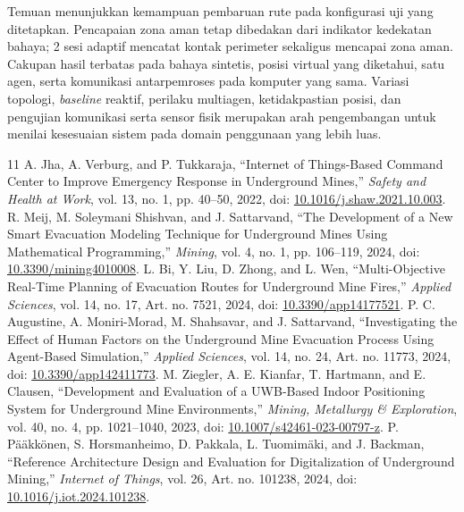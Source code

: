 \documentclass[10pt,a4paper]{article}
\begin{document}
Temuan menunjukkan kemampuan pembaruan rute pada konfigurasi uji yang ditetapkan. Pencapaian zona aman tetap dibedakan dari indikator kedekatan bahaya; 2 sesi adaptif mencatat kontak perimeter sekaligus mencapai zona aman. Cakupan hasil terbatas pada bahaya sintetis, posisi virtual yang diketahui, satu agen, serta komunikasi antarpemroses pada komputer yang sama. Variasi topologi, \emph{baseline} reaktif, perilaku multiagen, ketidakpastian posisi, dan pengujian komunikasi serta sensor fisik merupakan arah pengembangan untuk menilai kesesuaian sistem pada domain penggunaan yang lebih luas.

\FloatBarrier
\begin{thebibliography}{11}
\setlength{\itemsep}{2pt}\setlength{\parskip}{0pt}
 A. Jha, A. Verburg, and P. Tukkaraja, ``Internet of Things-Based Command Center to Improve Emergency Response in Underground Mines,'' \emph{Safety and Health at Work}, vol. 13, no. 1, pp. 40--50, 2022, doi: \href{https://doi.org/10.1016/j.shaw.2021.10.003}{10.1016/j.shaw.2021.10.003}.
 R. Meij, M. Soleymani Shishvan, and J. Sattarvand, ``The Development of a New Smart Evacuation Modeling Technique for Underground Mines Using Mathematical Programming,'' \emph{Mining}, vol. 4, no. 1, pp. 106--119, 2024, doi: \href{https://doi.org/10.3390/mining4010008}{10.3390/mining4010008}.
 L. Bi, Y. Liu, D. Zhong, and L. Wen, ``Multi-Objective Real-Time Planning of Evacuation Routes for Underground Mine Fires,'' \emph{Applied Sciences}, vol. 14, no. 17, Art. no. 7521, 2024, doi: \href{https://doi.org/10.3390/app14177521}{10.3390/app14177521}.
 P. C. Augustine, A. Moniri-Morad, M. Shahsavar, and J. Sattarvand, ``Investigating the Effect of Human Factors on the Underground Mine Evacuation Process Using Agent-Based Simulation,'' \emph{Applied Sciences}, vol. 14, no. 24, Art. no. 11773, 2024, doi: \href{https://doi.org/10.3390/app142411773}{10.3390/app142411773}.
 M. Ziegler, A. E. Kianfar, T. Hartmann, and E. Clausen, ``Development and Evaluation of a UWB-Based Indoor Positioning System for Underground Mine Environments,'' \emph{Mining, Metallurgy \& Exploration}, vol. 40, no. 4, pp. 1021--1040, 2023, doi: \href{https://doi.org/10.1007/s42461-023-00797-z}{10.1007/s42461-023-00797-z}.
 P. Pääkkönen, S. Horsmanheimo, D. Pakkala, L. Tuomimäki, and J. Backman, ``Reference Architecture Design and Evaluation for Digitalization of Underground Mining,'' \emph{Internet of Things}, vol. 26, Art. no. 101238, 2024, doi: \href{https://doi.org/10.1016/j.iot.2024.101238}{10.1016/j.iot.2024.101238}.

\end{thebibliography}
\end{document}
